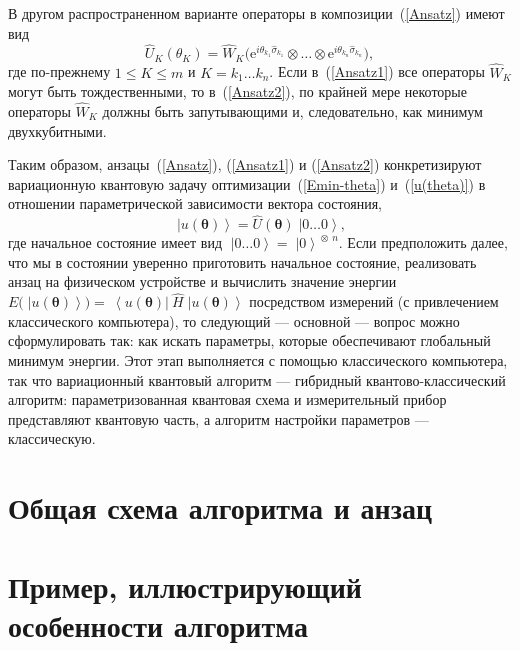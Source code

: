 \documentclass[a4paper]{report}
\newcommand{\ket}[1] {\!\!\;\ensuremath{\left|#1\right\rangle}}
\newcommand{\bra}[1] {\!\!\:\ensuremath{\left\langle#1\right|\!\!\:}}
\begin{document}
В другом распространенном варианте операторы в композиции~(\ref{Ansatz}) имеют вид
\begin{equation}\label{Ansatz2}
\hat{U}_{K}(\theta_K)= \hat{W}_K
\big(\mathrm{e}^{i\theta_{k_1}\hat{\sigma}_{k_1}} \otimes\ldots\otimes \mathrm{e}^{i\theta_{k_n}\hat{\sigma}_{k_n}}\big),
\end{equation}
где по-прежнему $1\!\leqslant\! K\!\leqslant\! m$ и $K\!=\!k_1\!\ldots k_n$. Если в~(\ref{Ansatz1}) все операторы $\hat{W}_K$ могут быть тождественными, то в~(\ref{Ansatz2}), по крайней мере некоторые операторы $\hat{W}_K$ должны быть запутывающими и, следовательно, как минимум двухкубитными.

Таким образом, анзацы~(\ref{Ansatz}), (\ref{Ansatz1}) и (\ref{Ansatz2}) конкретизируют вариационную квантовую задачу оптимизации~(\ref{Emin-theta}) и~(\ref{u(theta)}) в отношении параметрической зависимости вектора состояния,
\begin{equation*}
\ket{u(\bm\theta)}= \hat{U}(\bm\theta)\ket{0\ldots0},
\end{equation*}
где начальное состояние имеет вид ${\ket{0\ldots0}=\ket{0}^{\!\otimes\:\! n}}$. Если предположить далее, что мы в состоянии уверенно приготовить начальное состояние, реализовать анзац на физическом устройстве и вычислить значение энергии $E\big(\ket{u(\bm\theta)}\big)=\bra{u(\bm\theta)}\hat{H}\ket{u(\bm\theta)}$ посредством измерений (с привлечением классического компьютера), то следующий --- основной --- вопрос можно сформулировать так: как искать параметры, которые обеспечивают глобальный минимум энергии. Этот этап выполняется с помощью классического компьютера, так что вариационный квантовый алгоритм --- гибридный квантово-классический алгоритм: параметризованная квантовая схема и измерительный прибор представляют квантовую часть, а алгоритм настройки параметров — классическую.

\section{Общая схема алгоритма и анзац}



\section{Пример, иллюстрирующий особенности алгоритма}
\end{document}
